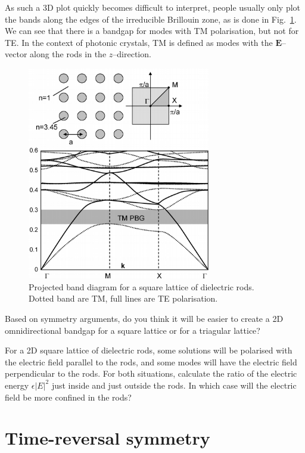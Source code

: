 As such a 3D plot quickly becomes difficult to interpret, people usually only plot the bands along the edges of the irreducible Brillouin zone, as is done in Fig.~\ref{fig-bands-rods}. We can see that there is a bandgap for modes with TM polarisation, but not for TE. In the context of photonic crystals, TM is defined as modes with the ${\mathbf E}$--vector along the rods in the $z$--direction.

\begin{figure}
\centering
\includegraphics[width=8cm]{symmetry/figures/square_bands}
\caption{Projected band diagram for a square lattice of dielectric rods. Dotted band are TM, full lines are TE polarisation.}
\label{fig-bands-rods}
\end{figure}

\begin{exer}
Based on symmetry arguments, do you think it will be easier to create a 2D omnidirectional bandgap for a square lattice or for a triagular lattice?
\end{exer}

\begin{exer}
For a 2D square lattice of dielectric rods, some solutions will be polarised with the electric field parallel to the rods, and some modes will have the electric field perpendicular to the rods. For both situations, calculate the ratio of the electric energy $\epsilon |E|^2$ just inside and just outside the rods. In which case will the electric field be more confined in the rods?
\end{exer}

 
\pagebreak

\section{Time-reversal symmetry}

